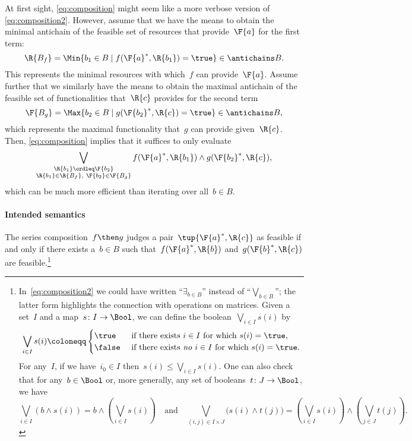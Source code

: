 \begin{remark}
  At first sight, \cref{eq:composition} might seem like a more verbose version of \cref{eq:composition2}. However, assume that we have the means to obtain the minimal antichain of the feasible set of resources that provide~$\F{a}$ for the first term:
  \begin{equation}
    \R{B_f} = \Min \{b_1\in B \mid f(\F{a}^*,\R{b_1})=\true\} \in \antichains B.
  \end{equation}
  This represents the minimal resources with which~$f$ can provide~$\F{a}$. Assume further that we similarly have the means to obtain the maximal antichain of the feasible set of functionalities that~$\R{c}$ provides for the second term
  \begin{equation}
    \F{B_g} = \Max \{b_2\in B \mid g(\F{b_2}^*,\R{c})=\true\} \in \antichains B,
  \end{equation}
  which represents the maximal functionality that~$g$ can provide given~$\R{c}$. Then, \cref{eq:composition} implies that it suffices to only evaluate
  \begin{equation}
    \bigvee_{\substack{\R{b_1}\ordleq\F{b_2} \\ \R{b_1}\in \R{B_f},~ \F{b_2}\in\F{B_g} }} f(\F{a}^*,\R{b_1}) \wedge g(\F{b_2}^*,\R{c}),
  \end{equation}
  which can be much more efficient than iterating over all~$b\in B$.
\end{remark}

\paragraph{Intended semantics}
The series composition~$f\then g$ judges a pair~$\tup{\F{a}^*,\R{c}}$ as feasible if and only if there exists a~$b \in B$ such that~$f(\F{a}^*,\R{b})$ and~$g(\F{b}^*,\R{c})$ are feasible.\footnote{In~\cref{eq:composition2} we could have written ``$\exists_{b\in B}$''
instead of ``$\bigvee_{b\in B}$''; the latter form highlights the connection
with operations on matrices. Given a set~$I$ and a map~$s\colon I\to\Bool$, we can define the boolean~$\bigvee_{i\in I}s(i)$ by
  \begin{equation*}
    \bigvee_{i\in I}s(i)\coloneqq
    \begin{cases}
      \true&\text{ if there exists }i\in I\text{ for which }s(i)=\true,\\
      \false&\text{ if there exists \emph{no} }i\in I\text{ for which }s(i)=\true.
    \end{cases}
  \end{equation*}
  For any~$I$, if we have~$i_0\in I$ then~$s(i)\leq\bigvee_{i\in I}s(i)$. One can also check that for any~$b\in\Bool$ or, more generally, any set of booleans~$t\colon J\to\Bool$, we have
  \begin{equation*}
    \bigvee_{i\in I}(b\wedge s(i))=b\wedge\left(\bigvee_{i\in I}s(i)\right)
    \quad\text{and}\quad
    \bigvee_{(i,j)\in I\times  J}\big(s(i)\wedge t(j)\big)=\left(\bigvee_{i\in I}s(i)\right)\wedge\left(\bigvee_{j\in J} t(j)\right).
  \end{equation*}
}

